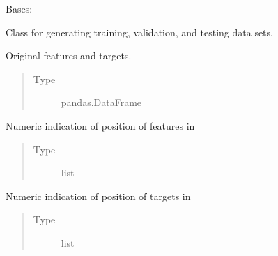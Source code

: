 \documentclass[letterpaper,10pt,english]{sphinxmanual}
\begin{document}
\begin{fulllineitems}
\label{\detokenize{api/ucf.TrainingDataSets:ucf.TrainingDataSets}}
Bases: 

Class for generating training, validation, and testing data sets.

\begin{fulllineitems}
\label{\detokenize{api/ucf.TrainingDataSets:ucf.TrainingDataSets.original_data}}
Original features and targets.
\begin{quote}\begin{description}
\item[{Type}] \leavevmode
pandas.DataFrame

\end{description}\end{quote}

\end{fulllineitems}


\begin{fulllineitems}
\label{\detokenize{api/ucf.TrainingDataSets:ucf.TrainingDataSets.indices_of_features}}
Numeric indication of position of features in 
\begin{quote}\begin{description}
\item[{Type}] \leavevmode
list

\end{description}\end{quote}

\end{fulllineitems}


\begin{fulllineitems}
\label{\detokenize{api/ucf.TrainingDataSets:ucf.TrainingDataSets.indices_of_targets}}
Numeric indication of position of targets in 
\begin{quote}\begin{description}
\item[{Type}] \leavevmode
list


\end{description}
\end{quote}
\end{fulllineitems}
\end{fulllineitems}
\end{document}
